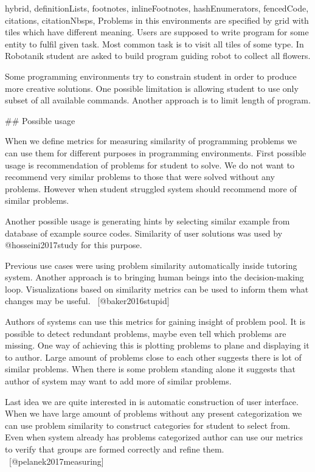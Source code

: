 \documentclass[
  digital, %
  table,   %
  lof,     %
  lot,     %
]{fithesis3}
\begin{document}
\begin{markdown*}{%
  hybrid,
  definitionLists,
  footnotes,
  inlineFootnotes,
  hashEnumerators,
  fencedCode,
  citations,
  citationNbsps,
}
Problems in this environments are specified by grid with tiles which have different meaning. Users are supposed to write program for some entity to fulfil given task. Most common task is to visit all tiles of some type. In Robotanik student are asked to build program guiding robot to collect all flowers.

Some programming environments try to constrain student in order to produce more creative solutions. One possible limitation is allowing student to use only subset of all available commands. Another approach is to limit length of program.

## Possible usage

When we define metrics for measuring similarity of programming problems we can use them for different purposes in programming environments. First possible usage is recommendation of problems for student to solve. We do not want to recommend very similar problems to those that were solved without any problems. However when student struggled system should recommend more of similar problems.

Another possible usage is generating hints by selecting similar example from database of example source codes. Similarity of user solutions was used by @hosseini2017study for this purpose.

Previous use cases were using problem similarity automatically inside tutoring system. Another approach is to bringing human beings into the decision-making loop. Visualizations based on similarity metrics can be used to inform them what changes may be useful. ~[@baker2016stupid]

Authors of systems can use this metrics for gaining insight of problem pool. It is possible to detect redundant problems, maybe even tell which problems are missing. One way of achieving this is plotting problems to plane and displaying it to author. Large amount of problems close to each other suggests there is lot of similar problems. When there is some problem standing alone it suggests that author of system may want to add more of similar problems.

Last idea we are quite interested in is automatic construction of user interface. When we have large amount of problems without any present categorization we can use problem similarity to construct categories for student to select from. Even when system already has problems categorized author can use our metrics to verify that groups are formed correctly and refine them. ~[@pelanek2017measuring]


\end{markdown*}
\end{document}
